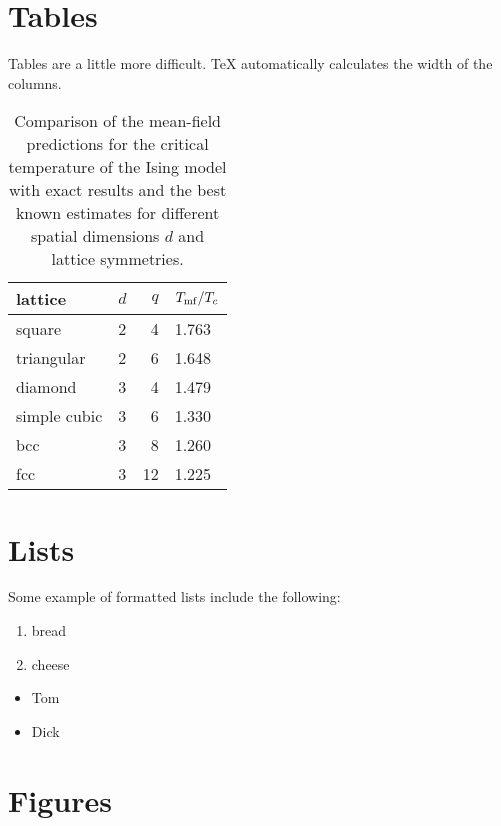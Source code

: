 \documentclass[12pt]{article}
\begin{document}
\section{Tables}
Tables are a little more difficult. TeX
automatically calculates the width of the columns.

\begin{table}[h]
\begin{center}
\begin{tabular}{|l|l|r|l|}
\hline
lattice & $d$ & $q$ & $T_{\rm mf}/T_c$ \\
\hline
square & 2 & 4 & 1.763 \\
\hline
triangular & 2 & 6 & 1.648 \\
\hline
diamond & 3 & 4 & 1.479 \\
\hline
simple cubic & 3 & 6 & 1.330 \\
\hline
bcc & 3 & 8 & 1.260 \\
\hline
fcc & 3 & 12 & 1.225 \\
\hline
\end{tabular}
\caption{\label{tab:5/tc}Comparison of the mean-field predictions
for the critical temperature of the Ising model with exact results
and the best known estimates for different spatial dimensions $d$
and lattice symmetries.}
\end{center}
\end{table}

\section{Lists}

Some example of formatted lists include the
following:

\begin{enumerate}

\item bread

\item cheese

\end{enumerate}

\begin{itemize}

\item Tom

\item Dick

\end{itemize}

\section{Figures}
\end{document}
